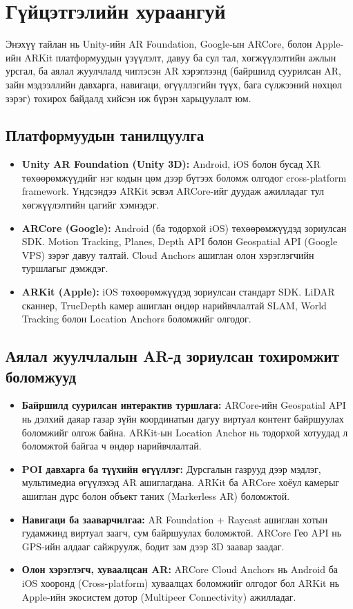 \chapter*{Гүйцэтгэлийн хураангуй}
\begin{sloppy}

Энэхүү тайлан нь Unity-ийн AR Foundation, Google-ын ARCore, болон Apple-ийн ARKit платформуудын үзүүлэлт, давуу ба сул тал, хөгжүүлэлтийн ажлын урсгал, ба аялал жуулчлалд чиглэсэн AR хэрэглээнд (байршилд суурилсан AR, зайн мэдээллийн давхарга, навигаци, өгүүллэгийн түүх, бага сүлжээний нөхцөл зэрэг) тохирох байдалд хийсэн иж бүрэн харьцуулалт юм.

\section*{Платформуудын танилцуулга}
\begin{itemize}
    \item \textbf{Unity AR Foundation (Unity 3D):} Android, iOS болон бусад XR төхөөрөмжүүдийг нэг кодын цөм дээр бүтээх боломж олгодог cross-platform framework. Үндсэндээ ARKit эсвэл ARCore-ийг дуудаж ажилладаг тул хөгжүүлэлтийн цагийг хэмнэдэг.
    \item \textbf{ARCore (Google):} Android (ба тодорхой iOS) төхөөрөмжүүдэд зориулсан SDK. Motion Tracking, Planes, Depth API болон Geospatial API (Google VPS) зэрэг давуу талтай. Cloud Anchors ашиглан олон хэрэглэгчийн туршлагыг дэмждэг.
    \item \textbf{ARKit (Apple):} iOS төхөөрөмжүүдэд зориулсан стандарт SDK. LiDAR сканнер, TrueDepth камер ашиглан өндөр нарийвчлалтай SLAM, World Tracking болон Location Anchors боломжийг олгодог.
\end{itemize}

\section*{Аялал жуулчлалын AR-д зориулсан тохиромжит боломжууд}
\begin{itemize}
    \item \textbf{Байршилд суурилсан интерактив туршлага:} ARCore-ийн Geospatial API нь дэлхий даяар газар зүйн координатын дагуу виртуал контент байршуулах боломжийг олгож байна. ARKit-ын Location Anchor нь тодорхой хотуудад л боломжтой байгаа ч өндөр нарийвчлалтай.
    \item \textbf{POI давхарга ба түүхийн өгүүллэг:} Дурсгалын газрууд дээр мэдлэг, мультимедиа өгүүлэхэд AR ашиглагдана. ARKit ба ARCore хоёул камерыг ашиглан дүрс болон объект таних (Markerless AR) боломжтой.
    \item \textbf{Навигаци ба зааварчилгаа:} AR Foundation + Raycast ашиглан хотын гудамжинд виртуал заагч, сум байршуулах боломжтой. ARCore Гео API нь GPS-ийн алдааг сайжруулж, бодит зам дээр 3D заавар заадаг.
    \item \textbf{Олон хэрэглэгч, хуваалцсан AR:} ARCore Cloud Anchors нь Android ба iOS хооронд (Cross-platform) хуваалцах боломжийг олгодог бол ARKit нь Apple-ийн экосистем дотор (Multipeer Connectivity) ажилладаг.
\end{itemize}


\end{sloppy}
